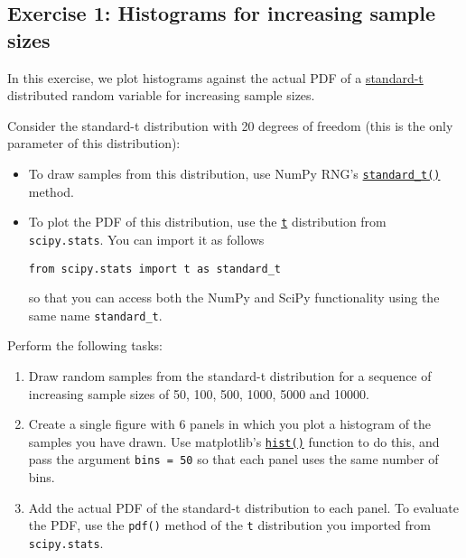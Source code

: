 \documentclass[10pt]{scrartcl}
\providecommand{\tightlist}{%
      \setlength{\itemsep}{0pt}\setlength{\parskip}{0pt}}
\begin{document}
    \hypertarget{exercise-1-histograms-for-increasing-sample-sizes}{%
\subsection{Exercise 1: Histograms for increasing sample
sizes}\label{exercise-1-histograms-for-increasing-sample-sizes}}

In this exercise, we plot histograms against the actual PDF of a
\href{https://en.wikipedia.org/wiki/Student\%27s_t-distribution}{standard-t}
distributed random variable for increasing sample sizes.

Consider the standard-t distribution with 20 degrees of freedom (this is
the only parameter of this distribution):

\begin{itemize}
\item
  To draw samples from this distribution, use NumPy RNG's
  \href{https://numpy.org/doc/stable/reference/random/generated/numpy.random.Generator.standard_t.html}{\texttt{standard\_t()}}
  method.
\item
  To plot the PDF of this distribution, use the
  \href{https://docs.scipy.org/doc/scipy/reference/generated/scipy.stats.t.html}{\texttt{t}}
  distribution from \texttt{scipy.stats}. You can import it as follows

\begin{verbatim}
from scipy.stats import t as standard_t
\end{verbatim}

  so that you can access both the NumPy and SciPy functionality using
  the same name \texttt{standard\_t}.
\end{itemize}

Perform the following tasks:

\begin{enumerate}
\def\labelenumi{\arabic{enumi}.}
\tightlist
\item
  Draw random samples from the standard-t distribution for a sequence of
  increasing sample sizes of 50, 100, 500, 1000, 5000 and 10000.
\item
  Create a single figure with 6 panels in which you plot a histogram of
  the samples you have drawn. Use matplotlib's
  \href{https://matplotlib.org/api/_as_gen/matplotlib.pyplot.hist.html}{\texttt{hist()}}
  function to do this, and pass the argument \texttt{bins\ =\ 50} so
  that each panel uses the same number of bins.
\item
  Add the actual PDF of the standard-t distribution to each panel. To
  evaluate the PDF, use the \texttt{pdf()} method of the \texttt{t}
  distribution you imported from \texttt{scipy.stats}.
\end{enumerate}
\end{document}
